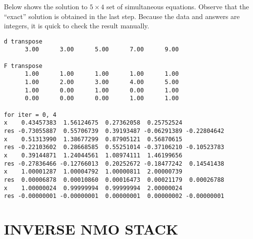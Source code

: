 \par
Below shows the solution to $5 \times 4$ set of simultaneous equations.
Observe that the ``exact'' solution is obtained in the last step.
Because the data and answers are integers,
it is quick to check the result manually.
\par
\noindent
\footnotesize
\begin{verbatim}
d transpose
      3.00      3.00      5.00      7.00      9.00

F transpose
      1.00      1.00      1.00      1.00      1.00
      1.00      2.00      3.00      4.00      5.00
      1.00      0.00      1.00      0.00      1.00
      0.00      0.00      0.00      1.00      1.00

for iter = 0, 4
x    0.43457383  1.56124675  0.27362058  0.25752524
res -0.73055887  0.55706739  0.39193487 -0.06291389 -0.22804642
x    0.51313990  1.38677299  0.87905121  0.56870615
res -0.22103602  0.28668585  0.55251014 -0.37106210 -0.10523783
x    0.39144871  1.24044561  1.08974111  1.46199656
res -0.27836466 -0.12766013  0.20252672 -0.18477242  0.14541438
x    1.00001287  1.00004792  1.00000811  2.00000739
res  0.00006878  0.00010860  0.00016473  0.00021179  0.00026788
x    1.00000024  0.99999994  0.99999994  2.00000024
res -0.00000001 -0.00000001  0.00000001  0.00000002 -0.00000001
\end{verbatim}
\normalsize


\section{INVERSE NMO STACK}

